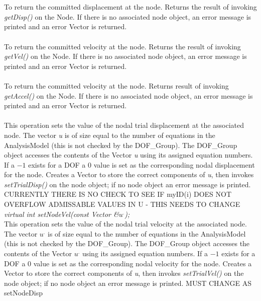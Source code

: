   \\
 \\
To return the committed displacement at the node. Returns the result
of invoking {\em getDisp()} on the Node. If there is no associated
node object, an error message is printed and an error Vector is
returned. \\


 \\
To return the committed velocity at the node. Returns the result of
invoking {\em getVel()} on the Node. If there is no associated node
object, an error message is printed and an error Vector is returned. \\

 \\
To return the committed velocity at the node. Returns result of
invoking  {\em getAccel()} on the Node. If there is no associated node
object, an error message is printed and an error Vector is returned. \\

 \\
This operation sets the value of the nodal trial displacement at the
associated node. The vector {\em u} is of size equal to the number of
equations in the AnalysisModel (this is not checked by the DOF\_Group).
The DOF\_Group object accesses the contents of the Vector {\em u} using
its assigned equation numbers. If a $-1$ exists for a DOF a $0$ value
is set as the corresponding nodal displacement for the node. Creates a Vector
to store the correct components of {\em u}, then invokes {\em setTrialDisp()}
on the node object; if no node object an error message is
printed. CURRENTLY THERE IS NO CHECK TO SEE IF myID(i) DOES NOT OVERFLOW
ADMISSABLE VALUES IN U - THIS NEEDS TO CHANGE \\


{\em virtual int setNodeVel(const Vector \&$u^{.}$);}\\
This operation sets the value of the nodal trial velocity at the
associated node. The vector {\em $u^{.}$} is of size equal to the number of
equations in the AnalysisModel (this is not checked by the DOF\_Group).
The DOF\_Group object accesses the contents of the Vector {\em $u^{.}$} using
its assigned equation numbers. If a $-1$ exists for a DOF a $0$ value
is set as the corresponding nodal velocity for the node.  Creates a Vector
to store the correct components of {\em u}, then invokes {\em setTrialVel()}
on the node object; if no node object an error message is printed. 
MUST CHANGE AS setNodeDisp \\

